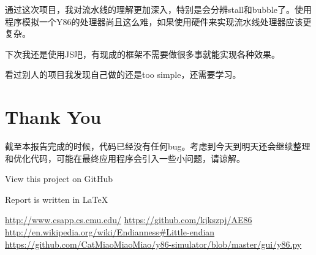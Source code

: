 \documentclass{article}
\begin{document}
通过这次项目，我对流水线的理解更加深入，特别是会分辨stall和bubble了。使用程序模拟一个Y86的处理器尚且这么难，如果使用硬件来实现流水线处理器应该更复杂。

下次我还是使用JS吧，有现成的框架不需要做很多事就能实现各种效果。

看过别人的项目我发现自己做的还是too simple，还需要学习。

\section{Thank You}
\indent\indent
{\Large{
截至本报告完成的时候，代码已经没有任何bug。考虑到今天到明天还会继续整理和优化代码，可能在最终应用程序会引入一些小问题，请谅解。

View this project on GitHub\cite{2}

Report is written in \LaTeX}}

\begin{thebibliography}{99}
 \url{http://www.csapp.cs.cmu.edu/}
 \url{https://github.com/kjkszpj/AE86}
 \url{http://en.wikipedia.org/wiki/Endianness#Little-endian}
 \url{https://github.com/CatMiaoMiaoMiao/y86-simulator/blob/master/gui/y86.py}
\end{thebibliography}
\end{document}
